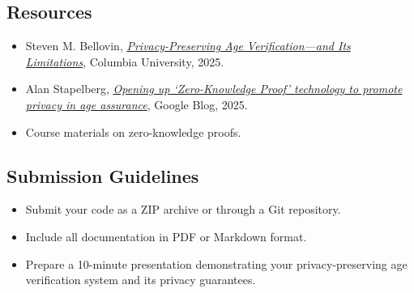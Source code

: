 \documentclass[10pt,a4paper,american]{exam}
\begin{document}
\subsection*{Resources}
\begin{itemize}
	\item Steven M. Bellovin, \href{https://appliedcryptography.page/paper/\#age-verify}{\emph{Privacy-Preserving Age Verification—and Its Limitations}}, Columbia University, 2025.
	\item Alan Stapelberg, \href{https://blog.google/technology/safety-security/opening-up-zero-knowledge-proof-technology-to-promote-privacy-in-age-assurance/}{\emph{Opening up `Zero-Knowledge Proof' technology to promote privacy in age assurance}}, Google Blog, 2025.
	\item Course materials on zero-knowledge proofs.
\end{itemize}

\subsection*{Submission Guidelines}
\begin{itemize}
	\item Submit your code as a ZIP archive or through a Git repository.
	\item Include all documentation in PDF or Markdown format.
	\item Prepare a 10-minute presentation demonstrating your privacy-preserving age verification system and its privacy guarantees.
\end{itemize}
\end{document}
